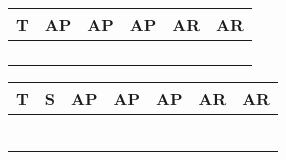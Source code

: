 \documentclass[10pt,twocolumn,letterpaper]{article}
\begin{document}
\begin{table*}
\centering
\begin{minipage}[t]{0.49\linewidth}
\centering
\renewcommand\arraystretch{1.4}
\renewcommand\tabcolsep{12.2pt}
\begin{small}
\begin{tabular}{c|ccccc}
\hline

\hline
\rowcolor{mygray}
T & AP & AP & AP & AR & AR 
\\
\hline
\hline
 &  &  &  &  &  \\
 &  &  &  &  &  \\
 &  &  &  &  &  \\
 &  &  &  &  &  \\
\hline

\hline
\end{tabular}
\end{small}
\caption{Effect of training clip length on AP. ``T'' indicates the number of frames for each video clip during training.}
\label{tab:train_clip_length}
\end{minipage}
\hfill
\begin{minipage}[t]{0.49\linewidth}
\centering
\renewcommand\arraystretch{1}
\renewcommand\tabcolsep{9.5pt}
\begin{small}
\begin{tabular}{cc|ccccc}
\hline

\hline
\rowcolor{mygray}
T & S & AP & AP & AP & AR & AR 
\\
\hline
\hline
 &  &  &  &  &  &  \\
 &  &  &  &  &  &  \\
 &  &  &  &  &  &  \\
 &  &  &  &  &  &  \\
 &  &  &  &  &  &  \\
 &  &  &  &  &  &  \\
\hline

\hline
\end{tabular}
\end{small}
\caption{Study the impact of clip length and stride during inference phase. ``T'' and ``S'' indicates the clip length and overlapping stride respectively.}
\label{tab:inference_clip_length}
\end{minipage}
\end{table*}
\end{document}
